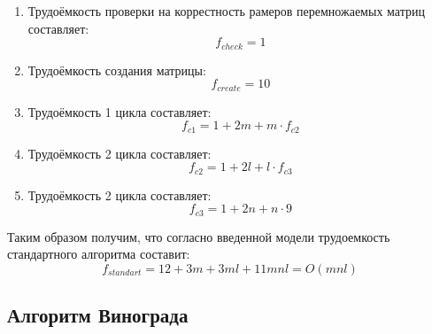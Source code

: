 \begin{enumerate}
	\item Трудоёмкость проверки на коррестность рамеров перемножаемых матриц составляет:
	\begin{equation}
	f_{check} = 1
	\end{equation}
	
	\item Трудоёмкость создания матрицы:
	\begin{equation}
	f_{create} = 10
	\end{equation}
	
	\item Трудоёмкость 1 цикла составляет:
	\begin{equation}
	\label{for:MV}
	f_{c1} = 1 + 2m + m \cdot f_{c2}
	\end{equation}

	\item Трудоёмкость 2 цикла составляет:
	\begin{equation}
	\label{for:MV}
	f_{c2} = 1 + 2l + l \cdot f_{c3}
	\end{equation}

	\item Трудоёмкость 2 цикла составляет:
	\begin{equation}
	\label{for:MV}
	f_{c3} = 1 + 2n + n \cdot 9
	\end{equation}
\end{enumerate}

Таким образом получим, что согласно введенной модели трудоемкость стандартного алгоритма составит:
$$
f_{standart} = 12 + 3m + 3ml + 11mnl = O(mnl)
$$
\clearpage

\subsection{Алгоритм Винограда}

